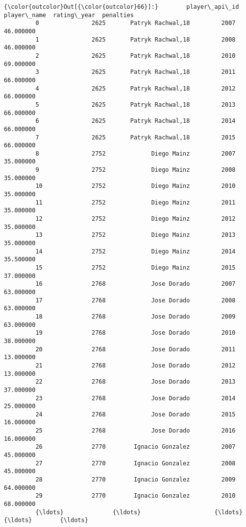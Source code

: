 \documentclass[11pt]{article}
\begin{document}
\begin{Verbatim}[commandchars=\\\{\}]
{\color{outcolor}Out[{\color{outcolor}66}]:}        player\_api\_id             player\_name  rating\_year  penalties
         0               2625       Patryk Rachwal,18         2007  46.000000
         1               2625       Patryk Rachwal,18         2008  46.000000
         2               2625       Patryk Rachwal,18         2010  69.000000
         3               2625       Patryk Rachwal,18         2011  66.000000
         4               2625       Patryk Rachwal,18         2012  66.000000
         5               2625       Patryk Rachwal,18         2013  66.000000
         6               2625       Patryk Rachwal,18         2014  66.000000
         7               2625       Patryk Rachwal,18         2015  66.000000
         8               2752             Diego Mainz         2007  35.000000
         9               2752             Diego Mainz         2008  35.000000
         10              2752             Diego Mainz         2010  35.000000
         11              2752             Diego Mainz         2011  35.000000
         12              2752             Diego Mainz         2012  35.000000
         13              2752             Diego Mainz         2013  35.000000
         14              2752             Diego Mainz         2014  35.500000
         15              2752             Diego Mainz         2015  37.000000
         16              2768             Jose Dorado         2007  63.000000
         17              2768             Jose Dorado         2008  63.000000
         18              2768             Jose Dorado         2009  63.000000
         19              2768             Jose Dorado         2010  38.000000
         20              2768             Jose Dorado         2011  13.000000
         21              2768             Jose Dorado         2012  13.000000
         22              2768             Jose Dorado         2013  37.000000
         23              2768             Jose Dorado         2014  25.000000
         24              2768             Jose Dorado         2015  16.000000
         25              2768             Jose Dorado         2016  16.000000
         26              2770        Ignacio Gonzalez         2007  45.000000
         27              2770        Ignacio Gonzalez         2008  45.000000
         28              2770        Ignacio Gonzalez         2009  64.000000
         29              2770        Ignacio Gonzalez         2010  68.000000
         {\ldots}              {\ldots}                     {\ldots}          {\ldots}        {\ldots}

\end{Verbatim}
\end{document}
